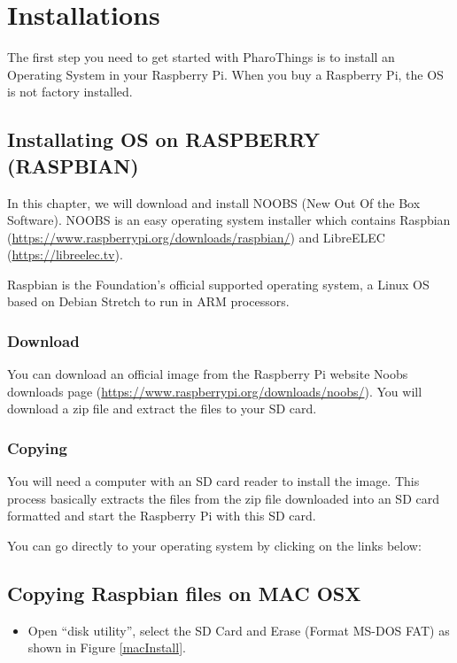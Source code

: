 \documentclass[10pt,twoside,english]{_support/latex/sbabook/sbabook}
\begin{document}
\frontmatter
\pagestyle{plain}

\tableofcontents*
\clearpage\listoffigures

\mainmatter

\chapter{Installations }
The first step you need to get started with PharoThings is to install an Operating System in your Raspberry Pi. When you buy a Raspberry Pi, the OS is not factory installed.
\section{Installating OS on RASPBERRY (RASPBIAN)}
In this chapter, we will download and install NOOBS (New Out Of the Box Software). NOOBS is an easy operating system installer which contains Raspbian (\url{https://www.raspberrypi.org/downloads/raspbian/}) and LibreELEC (\url{https://libreelec.tv}).

Raspbian is the Foundation’s official supported operating system, a Linux OS based on Debian Stretch to run in ARM processors.
\subsection{Download}
You can download an official image from the Raspberry Pi website Noobs downloads page (\url{https://www.raspberrypi.org/downloads/noobs/}). You will download a zip file and extract the files to your SD card.
\subsection{Copying}
You will need a computer with an SD card reader to install the image.
This process basically extracts the files from the zip file downloaded into an SD card formatted and start the Raspberry Pi with this SD card.

You can go directly to your operating system by clicking on the links below:
\section{Copying Raspbian files on MAC OSX}
\begin{itemize}
\item Open “disk utility”, select the SD Card and Erase (Format MS-DOS FAT) as shown in Figure \ref{macInstall}.
\end{itemize}
\end{document}
